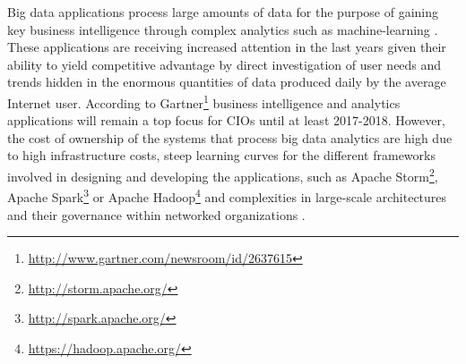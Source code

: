 
Big data applications process large amounts of data for the purpose of gaining key business intelligence through complex analytics such as machine-learning \cite{bdsurvey, ml4bd}. These applications are receiving increased attention in the last years given their ability to yield competitive advantage by direct investigation of user needs and trends hidden in the enormous quantities of data produced daily by the average Internet user. According to Gartner\footnote{\url{http://www.gartner.com/newsroom/id/2637615}} business intelligence and analytics applications will remain a top focus for CIOs until at least 2017-2018.
However, the cost of ownership of the systems that process big data analytics are high due to high infrastructure costs, steep learning curves for the different frameworks involved in designing and developing the applications, such as Apache Storm\footnote{\url{http://storm.apache.org/}}, Apache Spark\footnote{\url{http://spark.apache.org/}} or Apache Hadoop\footnote{\url{https://hadoop.apache.org/}} and complexities in large-scale architectures and their governance within networked organizations \cite{dynos}.


